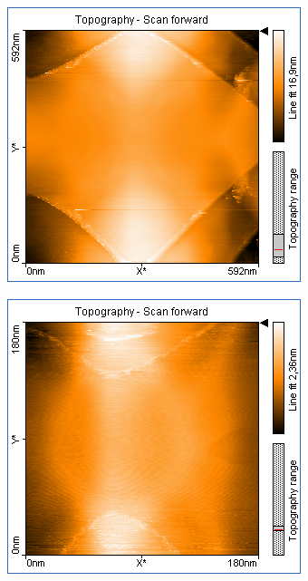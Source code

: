 \begin{figure}
    \begin{subfigure}[b]{\picwidth}
        \includegraphics[width=\textwidth]{data/Graphit/pic_06_01_600nm}
        \caption{}
        \label{fig:graphit_06_01}
    \end{subfigure}\qquad
    \begin{subfigure}[b]{\picwidth}
        \includegraphics[width=\textwidth]{data/Graphit/pic_06_02_180nm}

\end{subfigure}
\end{figure}
